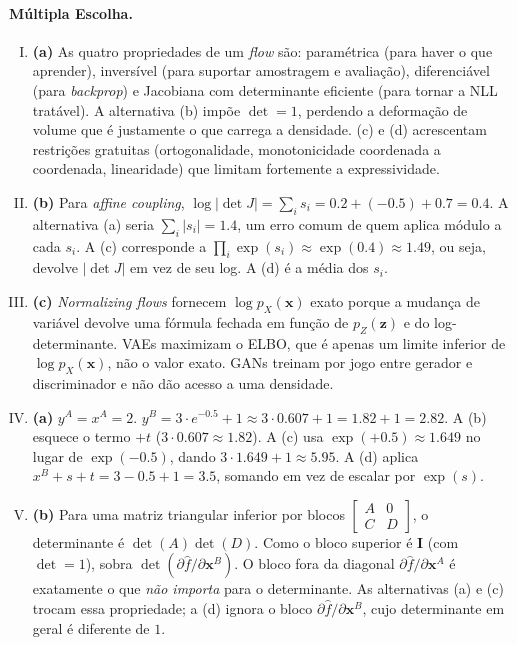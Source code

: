 \documentclass{dlproblemset}
\begin{document}
\paragraph{Múltipla Escolha.}
\begin{enumerate}[I)]
    \item \textbf{(a)} As quatro propriedades de um \textit{flow} são: paramétrica (para haver o que aprender), inversível (para suportar amostragem e avaliação), diferenciável (para \textit{backprop}) e Jacobiana com determinante eficiente (para tornar a NLL tratável). A alternativa (b) impõe $\det = 1$, perdendo a deformação de volume que é justamente o que carrega a densidade. (c) e (d) acrescentam restrições gratuitas (ortogonalidade, monotonicidade coordenada a coordenada, linearidade) que limitam fortemente a expressividade.

    \item \textbf{(b)} Para \textit{affine coupling}, $\log|\det J| = \sum_i s_i = 0.2 + (-0.5) + 0.7 = 0.4$. A alternativa (a) seria $\sum_i |s_i| = 1.4$, um erro comum de quem aplica módulo a cada $s_i$. A (c) corresponde a $\prod_i \exp(s_i) \approx \exp(0.4) \approx 1.49$, ou seja, devolve $|\det J|$ em vez de seu log. A (d) é a média dos $s_i$.

    \item \textbf{(c)} \textit{Normalizing flows} fornecem $\log p_X(\mathbf{x})$ exato porque a mudança de variável devolve uma fórmula fechada em função de $p_Z(\mathbf{z})$ e do log-determinante. VAEs maximizam o ELBO, que é apenas um limite inferior de $\log p_X(\mathbf{x})$, não o valor exato. GANs treinam por jogo entre gerador e discriminador e não dão acesso a uma densidade.

    \item \textbf{(a)} $y^A = x^A = 2$. $y^B = 3 \cdot e^{-0.5} + 1 \approx 3 \cdot 0.607 + 1 = 1.82 + 1 = 2.82$. A (b) esquece o termo $+t$ ($3 \cdot 0.607 \approx 1.82$). A (c) usa $\exp(+0.5) \approx 1.649$ no lugar de $\exp(-0.5)$, dando $3 \cdot 1.649 + 1 \approx 5.95$. A (d) aplica $x^B + s + t = 3 - 0.5 + 1 = 3.5$, somando em vez de escalar por $\exp(s)$.

    \item \textbf{(b)} Para uma matriz triangular inferior por blocos $\begin{bmatrix}A & 0 \\ C & D\end{bmatrix}$, o determinante é $\det(A)\det(D)$. Como o bloco superior é $\mathbf{I}$ (com $\det = 1$), sobra $\det(\partial \hat{f}/\partial \mathbf{x}^{B})$. O bloco fora da diagonal $\partial \hat{f}/\partial \mathbf{x}^{A}$ é exatamente o que \emph{não importa} para o determinante. As alternativas (a) e (c) trocam essa propriedade; a (d) ignora o bloco $\partial \hat{f}/\partial \mathbf{x}^{B}$, cujo determinante em geral é diferente de $1$.


\end{enumerate}
\end{document}
